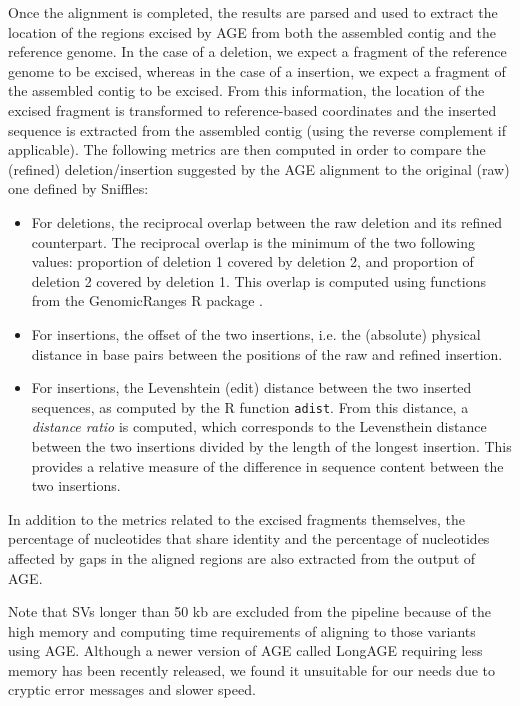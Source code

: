 \documentclass[12pt]{article}
\begin{document}
Once the alignment is completed, the results are parsed and used to extract the location of the regions excised by AGE from both the assembled contig and the reference genome.
In the case of a deletion, we expect a fragment of the reference genome to be excised, whereas in the case of a insertion, we expect a fragment of the assembled contig to be excised.
From this information, the location of the excised fragment is transformed to reference-based coordinates and the inserted sequence is extracted from the assembled contig (using the reverse complement if applicable).
The following metrics are then computed in order to compare the (refined) deletion/insertion suggested by the AGE alignment to the original (raw) one defined by Sniffles:

\begin{itemize}
	\item For deletions, the reciprocal overlap between the raw deletion and its refined counterpart. The reciprocal overlap is the minimum of the two following values: proportion of deletion 1 covered by deletion 2, and proportion of deletion 2 covered by deletion 1. This overlap is computed using functions from the GenomicRanges R package \citep{granges}.
	\item For insertions, the offset of the two insertions, i.e. the (absolute) physical distance in base pairs between the positions of the raw and refined insertion.
	\item For insertions, the Levenshtein (edit) distance between the two inserted sequences, as computed by the R function \texttt{adist}. From this distance, a {\em distance ratio} is computed, which corresponds to the Levensthein distance between the two insertions divided by the length of the longest insertion. This provides a relative measure of the difference in sequence content between the two insertions.
\end{itemize}

In addition to the metrics related to the excised fragments themselves, the percentage of nucleotides that share identity and the percentage of nucleotides affected by gaps in the aligned regions are also extracted from the output of AGE.

Note that SVs longer than 50 kb are excluded from the pipeline because of the high memory and computing time requirements of aligning to those variants using AGE.
Although a newer version of AGE called LongAGE \citep{longage} requiring less memory has been recently released, we found it unsuitable for our needs due to cryptic error messages and slower speed.
\end{document}
